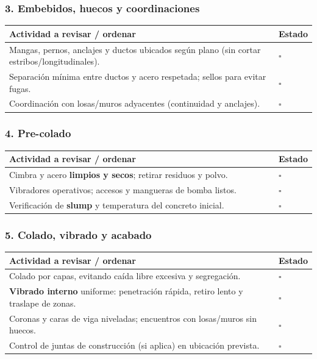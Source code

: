 \documentclass[12pt]{article}
\newcommand{\cbox}{\(\square\)} %
\begin{document}
	\subsubsection*{3. Embebidos, huecos y coordinaciones}
	\begin{tabularx}{\linewidth}{>{\raggedright\arraybackslash}p{0.93\linewidth} >{\centering\arraybackslash}m{0.07\linewidth}}
		\toprule
		\textbf{Actividad a revisar / ordenar} & \textbf{Estado}\\
		\midrule
		Mangas, pernos, anclajes y ductos ubicados según plano (sin cortar estribos/longitudinales). & \cbox \\
		Separación mínima entre ductos y acero respetada; sellos para evitar fugas. & \cbox \\
		Coordinación con losas/muros adyacentes (continuidad y anclajes). & \cbox \\
		\bottomrule
	\end{tabularx}
	
	\subsubsection*{4. Pre-colado}
	\begin{tabularx}{\linewidth}{>{\raggedright\arraybackslash}p{0.93\linewidth} >{\centering\arraybackslash}m{0.07\linewidth}}
		\toprule
		\textbf{Actividad a revisar / ordenar} & \textbf{Estado}\\
		\midrule
		Cimbra y acero \textbf{limpios y secos}; retirar residuos y polvo. & \cbox \\
		Vibradores operativos; accesos y mangueras de bomba listos. & \cbox \\
		Verificación de \textbf{slump} y temperatura del concreto inicial. & \cbox \\
		\bottomrule
	\end{tabularx}
	
	\subsubsection*{5. Colado, vibrado y acabado}
	\begin{tabularx}{\linewidth}{>{\raggedright\arraybackslash}p{0.93\linewidth} >{\centering\arraybackslash}m{0.07\linewidth}}
		\toprule
		\textbf{Actividad a revisar / ordenar} & \textbf{Estado}\\
		\midrule
		Colado por capas, evitando caída libre excesiva y segregación. & \cbox \\
		\textbf{Vibrado interno} uniforme: penetración rápida, retiro lento y traslape de zonas. & \cbox \\
		Coronas y caras de viga niveladas; encuentros con losas/muros sin huecos. & \cbox \\
		Control de juntas de construcción (si aplica) en ubicación prevista. & \cbox \\
		\bottomrule
	\end{tabularx}
	
\end{document}
